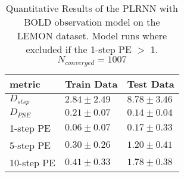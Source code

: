 \begin{table}
\centering
\caption{Quantitative Results of the PLRNN with BOLD observation model on the LEMON dataset. Model runs where excluded if the 1-step PE $>$ 1. $N_{converged}=1007$}
\label{tab:main_run_results}
\begin{tabular}{lll}
\toprule
metric & Train Data & Test Data \\
\midrule
$D_{stsp}$ & $2.84 \pm 2.49$ & $8.78 \pm 3.46$ \\
$D_{PSE}$ & $0.21 \pm 0.07$ & $0.14 \pm 0.04$ \\
1-step PE & $0.06 \pm 0.07$ & $0.17 \pm 0.33$ \\
5-step PE & $0.30 \pm 0.26$ & $1.20 \pm 0.41$ \\
10-step PE & $0.41 \pm 0.33$ & $1.78 \pm 0.38$ \\
\bottomrule
\end{tabular}
\end{table}
